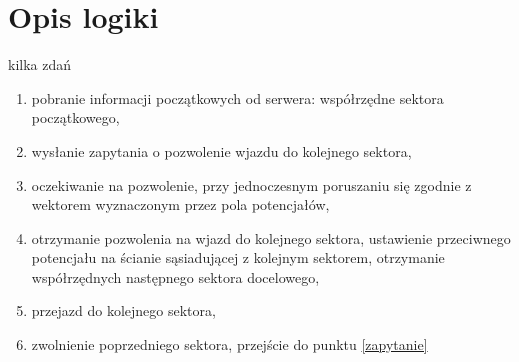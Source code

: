 \section{Opis logiki}

kilka zdań

\begin{enumerate}
  \item pobranie informacji początkowych od serwera: współrzędne
    sektora początkowego,

  \item wysłanie zapytania o pozwolenie wjazdu do kolejnego
    sektora, \label{zapytanie}

  \item oczekiwanie na pozwolenie, przy jednoczesnym poruszaniu się
    zgodnie z wektorem wyznaczonym przez pola potencjałów,
    
  \item otrzymanie pozwolenia na wjazd do kolejnego sektora,
    ustawienie przeciwnego potencjału na ścianie sąsiadującej z
    kolejnym sektorem, otrzymanie współrzędnych następnego sektora
    docelowego,

  \item przejazd do kolejnego sektora,

  \item zwolnienie poprzedniego sektora, przejście do punktu \ref{zapytanie} 

\end{enumerate}




